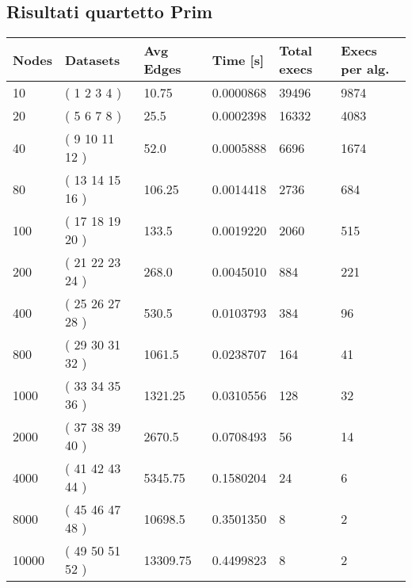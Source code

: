 \subsection{Risultati quartetto Prim}

\begin{longtable}{llllll}
    \textbf{Nodes} & \textbf{Datasets} & \textbf{Avg Edges} & \textbf{Time [s]} & \textbf{Total execs} & \textbf{Execs per alg.} \\
    \endhead
    10             & ( 1 2 3 4 )       & 10.75              & 0.0000868        & 39496                & 9874                    \\
    20             & ( 5 6 7 8 )       & 25.5               & 0.0002398        & 16332                & 4083                    \\
    40             & ( 9 10 11 12 )    & 52.0               & 0.0005888        & 6696                 & 1674                    \\
    80             & ( 13 14 15 16 )   & 106.25             & 0.0014418        & 2736                 & 684                     \\
    100            & ( 17 18 19 20 )   & 133.5              & 0.0019220        & 2060                 & 515                     \\
    200            & ( 21 22 23 24 )   & 268.0              & 0.0045010        & 884                  & 221                     \\
    400            & ( 25 26 27 28 )   & 530.5              & 0.0103793        & 384                  & 96                      \\
    800            & ( 29 30 31 32 )   & 1061.5             & 0.0238707        & 164                  & 41                      \\
    1000           & ( 33 34 35 36 )   & 1321.25            & 0.0310556        & 128                  & 32                      \\
    2000           & ( 37 38 39 40 )   & 2670.5             & 0.0708493        & 56                   & 14                      \\
    4000           & ( 41 42 43 44 )   & 5345.75            & 0.1580204        & 24                   & 6                       \\
    8000           & ( 45 46 47 48 )   & 10698.5            & 0.3501350        & 8                    & 2                       \\
    10000          & ( 49 50 51 52 )   & 13309.75           & 0.4499823        & 8                    & 2                       \\

\end{longtable}
